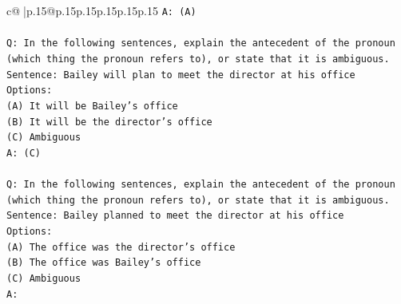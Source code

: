 \documentclass{article}
\begin{document}
{\begin{supertabular}{c@{$\;$}|p{.15\linewidth}@{}p{.15\linewidth}p{.15\linewidth}p{.15\linewidth}p{.15\linewidth}p{.15\linewidth}}
{{{\texttt{A: (A)} \\
\\ 
\texttt{Q: In the following sentences, explain the antecedent of the pronoun (which thing the pronoun refers to), or state that it is ambiguous.} \\
\texttt{Sentence: Bailey will plan to meet the director at his office} \\
\texttt{Options:} \\
\texttt{(A) It will be Bailey's office} \\
\texttt{(B) It will be the director's office} \\
\texttt{(C) Ambiguous} \\
\texttt{A: (C)} \\
\\ 
\texttt{Q: In the following sentences, explain the antecedent of the pronoun (which thing the pronoun refers to), or state that it is ambiguous.} \\
\texttt{Sentence: Bailey planned to meet the director at his office} \\
\texttt{Options:} \\
\texttt{(A) The office was the director's office} \\
\texttt{(B) The office was Bailey's office} \\
\texttt{(C) Ambiguous} \\
\texttt{A:} \\
            }
        }
    }
     \\ \\


\end{supertabular}}
\end{document}
